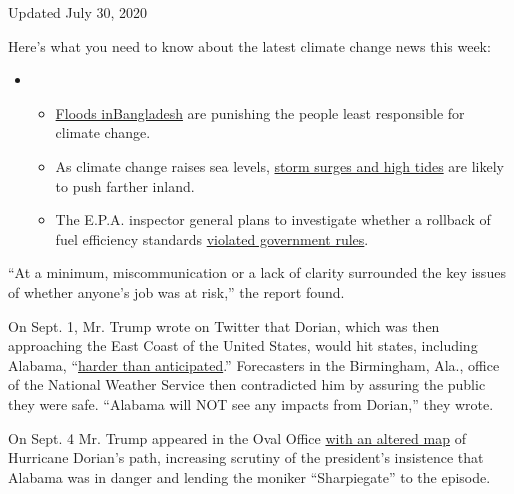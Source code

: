 Updated July 30, 2020

Here's what you need to know about the latest climate change news this
week:

\begin{itemize}
\item
  \begin{itemize}
  \tightlist
  \item
    \href{https://www.nytimes3xbfgragh.onion/2020/07/30/climate/bangladesh-floods.html?action=click\&pgtype=Article\&state=default\&region=MAIN_CONTENT_1\&context=storylines_keepup}{Floods
    in}\href{https://www.nytimes3xbfgragh.onion/2020/07/30/climate/bangladesh-floods.html?action=click\&pgtype=Article\&state=default\&region=MAIN_CONTENT_1\&context=storylines_keepup}{Bangladesh}
    are punishing the people least responsible for climate change.
  \item
    As climate change raises sea levels,
    \href{https://www.nytimes3xbfgragh.onion/2020/07/30/climate/sea-level-inland-floods.html?action=click\&pgtype=Article\&state=default\&region=MAIN_CONTENT_1\&context=storylines_keepup}{storm
    surges and high tides} are likely to push farther inland.
  \item
    The E.P.A. inspector general plans to investigate whether a rollback
    of fuel efficiency standards
    \href{https://www.nytimes3xbfgragh.onion/2020/07/27/climate/trump-fuel-efficiency-rule.html?action=click\&pgtype=Article\&state=default\&region=MAIN_CONTENT_1\&context=storylines_keepup}{violated
    government rules}.
  \end{itemize}
\end{itemize}

``At a minimum, miscommunication or a lack of clarity surrounded the key
issues of whether anyone's job was at risk,'' the report found.

On Sept. 1, Mr. Trump wrote on Twitter that Dorian, which was then
approaching the East Coast of the United States, would hit states,
including Alabama,
``\href{https://twitter.com/realDonaldTrump/status/1168174613827899393}{harder
than anticipated}.'' Forecasters in the Birmingham, Ala., office of the
National Weather Service then contradicted him by assuring the public
they were safe. ``Alabama will NOT see any impacts from Dorian,'' they
wrote.

On Sept. 4 Mr. Trump appeared in the Oval Office
\href{https://www.nytimes3xbfgragh.onion/2019/09/04/us/politics/trump-hurricane-alabama-sharpie.html}{with
an altered map} of Hurricane Dorian's path, increasing scrutiny of the
president's insistence that Alabama was in danger and lending the
moniker ``Sharpiegate'' to the episode.

